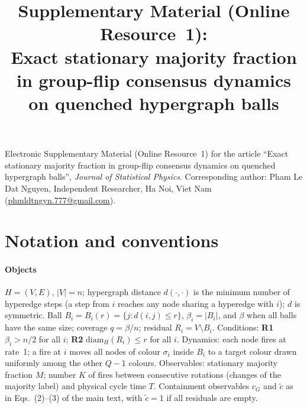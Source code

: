 \documentclass[pdflatex,sn-mathphys-num]{sn-jnl}
\theoremstyle{thmstyleone}%
\theoremstyle{thmstylethree}%
\theoremstyle{thmstyletwo}%
\newcommand{\ctil}{\tilde{c}}
\newcommand{\cG}{c_G}
\begin{document}
\title[Supplementary Material (Online Resource 1)]{Supplementary
Material (Online Resource~1):\\
Exact stationary majority fraction in group-flip consensus dynamics on quenched hypergraph balls}

\author*[1]{ }


\maketitle

\noindent Electronic Supplementary Material (Online Resource~1) for the
article ``Exact stationary majority fraction in group-flip consensus dynamics on quenched hypergraph balls'', \emph{Journal of
Statistical Physics}. Corresponding author: Pham Le Dat Nguyen,
Independent Researcher, Ha Noi, Viet Nam
(\href{mailto:phmldtngyn.777@gmail.com}{phmldtngyn.777@gmail.com}).

\section*{Notation and conventions}
\label{sec:S0}

\paragraph{Objects}
$H=(V,E)$, $|V|=n$; hypergraph distance $d(\cdot,\cdot)$ is the minimum
number of hyperedge steps (a step from $i$ reaches any node sharing a
hyperedge with $i$); $d$ is symmetric. Ball $B_i=B_i(r)=\{j:d(i,j)\le r\}$,
$\beta_i=|B_i|$, and $\beta$ when all balls have the same size; coverage
$q=\beta/n$; residual $R_i=V\setminus B_i$. Conditions: \textbf{R1}
$\beta_i>n/2$ for all $i$; \textbf{R2} $\mathrm{diam}_H(R_i)\le r$ for all
$i$. Dynamics: each node fires at rate~1; a fire at $i$ moves all nodes of
colour $\sigma_i$ inside $B_i$ to a target colour drawn uniformly among the
other $Q-1$ colours. Observables: stationary majority fraction $M$; number
$K$ of fires between consecutive rotations (changes of the majority
label) and physical cycle time $T$. Containment observables $\cG$ and
$\ctil$ as in Eqs.~(2)--(3) of the main text, with $\ctil=1$ if all
residuals are empty.
\end{document}
